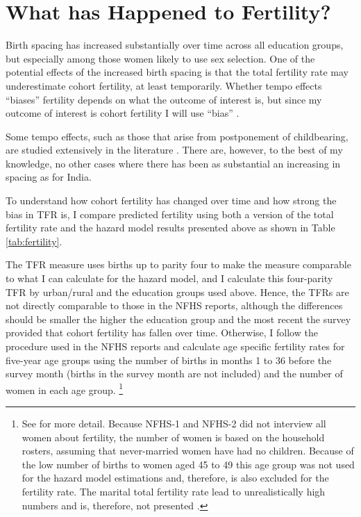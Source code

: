 \documentclass[12pt,letterpaper]{article}
\begin{document}
\section{What has Happened to Fertility?\label{sec:fertility}}

Birth spacing has increased substantially over time across all education groups, but 
especially among those women likely to use sex selection.
One of the potential effects of the increased birth spacing is that the total fertility
rate may underestimate cohort fertility, at least temporarily.
Whether tempo effects ``biases'' fertility depends on what the outcome of interest is,
but since my outcome of interest is cohort fertility I will use ``bias''
\citep{Ni-Bhrolchain2011}.

Some tempo effects, such as those that arise from postponement of childbearing, are 
studied extensively in the literature \citep{Bongaarts1999}.
There are, however, to the best of my knowledge, no other cases where there has been
as substantial an increasing in spacing as for India.
 
To understand how cohort fertility has changed over time and how strong the bias in
TFR is, I compare predicted fertility using both a version of the total fertility
rate and the hazard model results presented above as shown in Table \ref{tab:fertility}.



The TFR measure uses births up to parity four to make the measure comparable to what I 
can calculate for the hazard model, and I calculate this four-parity TFR by urban/rural 
and the education groups used above.
Hence, the TFRs are not directly comparable to those in the NFHS reports, although the
differences should be smaller the higher the education group and the most recent the 
survey provided that cohort fertility has fallen over time.
Otherwise, I follow the procedure used in the NFHS reports and calculate age specific 
fertility rates for five-year age groups using the number of births in months 1 to 36 
before the survey month (births in the survey month are not included) and the number
of women in each age group.%
\footnote{
See \citet{Croft2018} for more detail.
Because NFHS-1 and NFHS-2 did not interview all women about fertility, the number of women 
is based on the household rosters, assuming that never-married women have had no children.
Because of the low number of births to women aged 45 to 49 this age group was not
used for the hazard model estimations and, therefore, is also excluded for the fertility
rate.
The marital total fertility rate lead to unrealistically high numbers and is, therefore,
not presented \citep{Hoem2011,Laplante2015}.
}
\end{document}
